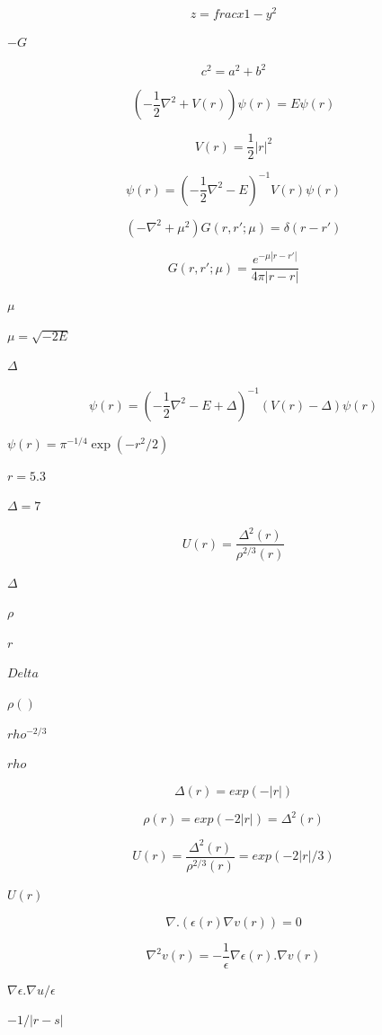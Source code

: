 \documentclass{article}
\begin{document}
\[
z = frac{x}{1 - y^2}
\]
\pagebreak

$-G$
\pagebreak

\[
c^2 = a^2 + b^2
\]
\pagebreak

\[
\left( -\frac{1}{2} \nabla^2 + V(r) \right) \psi(r) = E \psi(r)
\]
\pagebreak

\[
V(r) = \frac{1}{2} |r|^2
\]
\pagebreak

\[
\psi(r) = \left( -\frac{1}{2} \nabla^2 - E \right)^{-1} V(r) \psi(r)
\]
\pagebreak

\[
\left(-\nabla^2 + \mu^2 \right) G(r,r'; \mu) = \delta(r-r')
\]
\pagebreak

\[
G(r,r'; \mu) = \frac{e^{-\mu |r-r'|}}{4 \pi |r-r|}
\]
\pagebreak

$\mu$
\pagebreak

$\mu = \sqrt{-2 E}$
\pagebreak

$\Delta$
\pagebreak

\[
\psi(r) = \left( -\frac{1}{2} \nabla^2 - E + \Delta \right)^{-1} \left( V(r) -\Delta\right)  \psi(r)
\]
\pagebreak

$\psi(r)=\pi^{-1/4}\exp(-r^2 / 2)$
\pagebreak

$r=5.3$
\pagebreak

$\Delta=7$
\pagebreak

\[
U(r) = \frac{\Delta^2 (r)}{\rho^{2/3} (r)}
\]
\pagebreak

$ \Delta $
\pagebreak

$ \rho $
\pagebreak

$ r $
\pagebreak

$ Delta $
\pagebreak

$ \rho() $
\pagebreak

$ rho^{-2/3} $
\pagebreak

$ rho $
\pagebreak

\[
\Delta(r) = exp(- | r | )
\]
\pagebreak

\[
\rho(r) = exp(- 2 | r | ) = \Delta^2(r)
\]
\pagebreak

\[
U(r) = \frac{\Delta^2 (r)}{\rho^{2/3} (r)} = exp( - 2 | r | / 3)
\]
\pagebreak

$
U(r) $
\pagebreak

\[
\nabla . \left( \epsilon(r) \nabla v(r)  \right) = 0
\]
\pagebreak

\[
   \nabla^2 v(r) = - \frac{1}{\epsilon} \nabla \epsilon(r) .  \nabla v(r)
\]
\pagebreak

$\nabla \epsilon . \nabla u / \epsilon$
\pagebreak

$-1 / |r-s|$
\pagebreak
\end{document}
